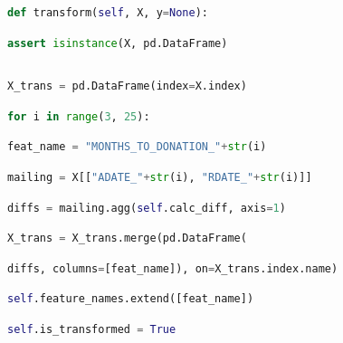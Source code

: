\documentclass[
  11pt,
  a4paper,
  DIV=12,captions=tableheading,oneside]{scrbook}
\begin{document}
\begin{lstlisting}[language=Python,stepnumber=2,basicstyle=\footnotesize]
\end{lstlisting}
\begin{lstlisting}[language=Python,stepnumber=2,basicstyle=\footnotesize]
    def transform(self, X, y=None):\end{lstlisting}
\begin{lstlisting}[language=Python,stepnumber=2,basicstyle=\footnotesize]
        assert isinstance(X, pd.DataFrame)\end{lstlisting}
\begin{lstlisting}[language=Python,stepnumber=2,basicstyle=\footnotesize]
\end{lstlisting}
\begin{lstlisting}[language=Python,stepnumber=2,basicstyle=\footnotesize]
        X_trans = pd.DataFrame(index=X.index)\end{lstlisting}
\begin{lstlisting}[language=Python,stepnumber=2,basicstyle=\footnotesize]
        for i in range(3, 25):\end{lstlisting}
\begin{lstlisting}[language=Python,stepnumber=2,basicstyle=\footnotesize]
            feat_name = "MONTHS_TO_DONATION_"+str(i)\end{lstlisting}
\begin{lstlisting}[language=Python,stepnumber=2,basicstyle=\footnotesize]
            mailing = X[["ADATE_"+str(i), "RDATE_"+str(i)]]\end{lstlisting}
\begin{lstlisting}[language=Python,stepnumber=2,basicstyle=\footnotesize]
            diffs = mailing.agg(self.calc_diff, axis=1)\end{lstlisting}
\begin{lstlisting}[language=Python,stepnumber=2,basicstyle=\footnotesize]
            X_trans = X_trans.merge(pd.DataFrame(\end{lstlisting}
\begin{lstlisting}[language=Python,stepnumber=2,basicstyle=\footnotesize]
                diffs, columns=[feat_name]), on=X_trans.index.name)\end{lstlisting}
\begin{lstlisting}[language=Python,stepnumber=2,basicstyle=\footnotesize]
            self.feature_names.extend([feat_name])\end{lstlisting}
\begin{lstlisting}[language=Python,stepnumber=2,basicstyle=\footnotesize]
            self.is_transformed = True\end{lstlisting}
\end{document}
